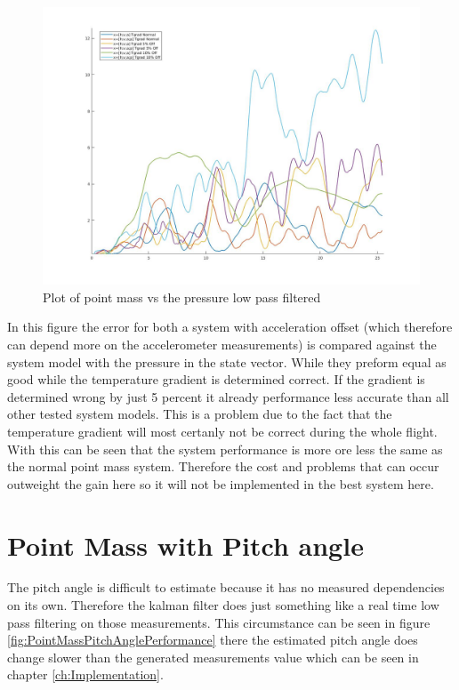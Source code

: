 \begin{figure}[h!]
 \centering
 \includegraphics[width=.8 \textwidth]{./Pictures/PointMassVSPressure.jpg}
 \caption{Plot of point mass vs the pressure low pass filtered}
 \label{fig:PointMassVSPressure}
\end{figure}

In this figure the error for both a system with acceleration offset (which therefore can depend more on the accelerometer measurements) is compared against the system model with the pressure in the state vector.
While they preform equal as good while the temperature gradient is determined correct.
If the gradient is determined wrong by just 5 percent it already performance less accurate than all other tested system models.
This is a problem due to the fact that the temperature gradient will most certanly not be correct during the whole flight.
With this can be seen that the system performance is more ore less the same as the normal point mass system.
Therefore the cost and problems that can occur outweight the gain here so it will not be implemented in the best system here.

\newpage
\section{Point Mass with Pitch angle}
The pitch angle is difficult to estimate because it has no measured dependencies on its own.
Therefore the kalman filter does just something like a real time low pass filtering on those measurements.
This circumstance can be seen in figure \ref{fig:PointMassPitchAnglePerformance} there the estimated pitch angle does change slower than the generated measurements value which can be seen in chapter \ref{ch:Implementation}.

